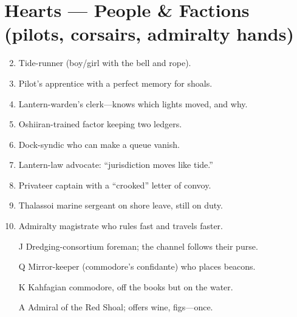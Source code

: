 \section*{Hearts --- People \& Factions (pilots, corsairs, admiralty hands)}
\begin{enumerate}
\setcounter{enumi}{1}
\item Tide-runner (boy/girl with the bell and rope).
\item Pilot's apprentice with a perfect memory for shoals.
\item Lantern-warden's clerk---knows which lights moved, and why.
\item Oshiiran-trained factor keeping two ledgers.
\item Dock-syndic who can make a queue vanish.
\item Lantern-law advocate: ``jurisdiction moves like tide.''
\item Privateer captain with a ``crooked'' letter of convoy.
\item Thalassoi marine sergeant on shore leave, still on duty.
\item Admiralty magistrate who rules fast and travels faster.
\item[J] Dredging-consortium foreman; the channel follows their purse.
\item[Q] Mirror-keeper (commodore's confidante) who places beacons.
\item[K] Kahfagian commodore, off the books but on the water.
\item[A] Admiral of the Red Shoal; offers wine, figs---once.
\end{enumerate}

